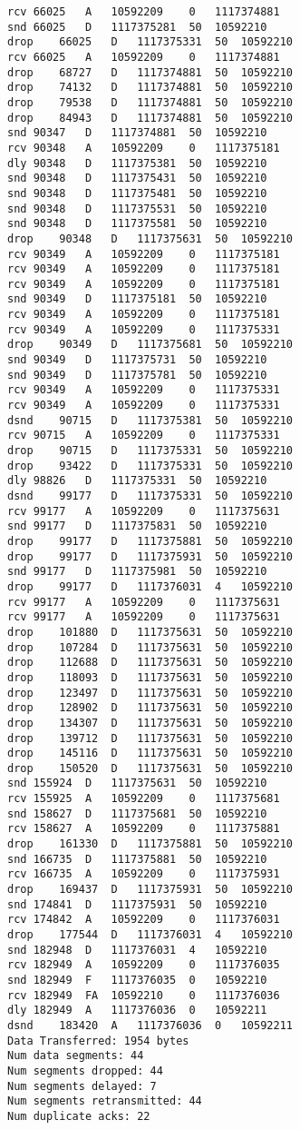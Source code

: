 \documentclass[a4paper]{article}
\begin{document}
\begin{lstlisting}
rcv	66025	A	10592209	0	1117374881
snd	66025	D	1117375281	50	10592210
drop	66025	D	1117375331	50	10592210
rcv	66025	A	10592209	0	1117374881
drop	68727	D	1117374881	50	10592210
drop	74132	D	1117374881	50	10592210
drop	79538	D	1117374881	50	10592210
drop	84943	D	1117374881	50	10592210
snd	90347	D	1117374881	50	10592210
rcv	90348	A	10592209	0	1117375181
dly	90348	D	1117375381	50	10592210
snd	90348	D	1117375431	50	10592210
snd	90348	D	1117375481	50	10592210
snd	90348	D	1117375531	50	10592210
snd	90348	D	1117375581	50	10592210
drop	90348	D	1117375631	50	10592210
rcv	90349	A	10592209	0	1117375181
rcv	90349	A	10592209	0	1117375181
rcv	90349	A	10592209	0	1117375181
snd	90349	D	1117375181	50	10592210
rcv	90349	A	10592209	0	1117375181
rcv	90349	A	10592209	0	1117375331
drop	90349	D	1117375681	50	10592210
snd	90349	D	1117375731	50	10592210
snd	90349	D	1117375781	50	10592210
rcv	90349	A	10592209	0	1117375331
rcv	90349	A	10592209	0	1117375331
dsnd	90715	D	1117375381	50	10592210
rcv	90715	A	10592209	0	1117375331
drop	90715	D	1117375331	50	10592210
drop	93422	D	1117375331	50	10592210
dly	98826	D	1117375331	50	10592210
dsnd	99177	D	1117375331	50	10592210
rcv	99177	A	10592209	0	1117375631
snd	99177	D	1117375831	50	10592210
drop	99177	D	1117375881	50	10592210
drop	99177	D	1117375931	50	10592210
snd	99177	D	1117375981	50	10592210
drop	99177	D	1117376031	4	10592210
rcv	99177	A	10592209	0	1117375631
rcv	99177	A	10592209	0	1117375631
drop	101880	D	1117375631	50	10592210
drop	107284	D	1117375631	50	10592210
drop	112688	D	1117375631	50	10592210
drop	118093	D	1117375631	50	10592210
drop	123497	D	1117375631	50	10592210
drop	128902	D	1117375631	50	10592210
drop	134307	D	1117375631	50	10592210
drop	139712	D	1117375631	50	10592210
drop	145116	D	1117375631	50	10592210
drop	150520	D	1117375631	50	10592210
snd	155924	D	1117375631	50	10592210
rcv	155925	A	10592209	0	1117375681
snd	158627	D	1117375681	50	10592210
rcv	158627	A	10592209	0	1117375881
drop	161330	D	1117375881	50	10592210
snd	166735	D	1117375881	50	10592210
rcv	166735	A	10592209	0	1117375931
drop	169437	D	1117375931	50	10592210
snd	174841	D	1117375931	50	10592210
rcv	174842	A	10592209	0	1117376031
drop	177544	D	1117376031	4	10592210
snd	182948	D	1117376031	4	10592210
rcv	182949	A	10592209	0	1117376035
snd	182949	F	1117376035	0	10592210
rcv	182949	FA	10592210	0	1117376036
dly	182949	A	1117376036	0	10592211
dsnd	183420	A	1117376036	0	10592211
Data Transferred: 1954 bytes
Num data segments: 44
Num segments dropped: 44
Num segments delayed: 7
Num segments retransmitted: 44
Num duplicate acks: 22
\end{lstlisting}
\end{document}
